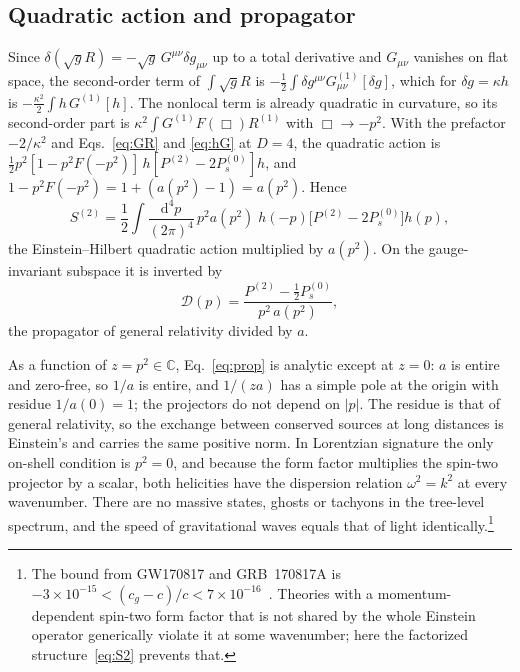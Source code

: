 \documentclass[aps,prd,10pt,twocolumn,superscriptaddress,nofootinbib,floatfix,longbibliography]{revtex4-2}
\newcommand{\bC}{\mathbb{C}}
\newcommand{\dd}{\mathrm{d}}
\newcommand{\Pt}{P^{(2)}}
\newcommand{\Ps}{P^{(0)}_{s}}
\begin{document}
\subsection{Quadratic action and propagator}
\label{sec:prop}

Since $\delta(\sqrt gR)=-\sqrt g\,G^{\mu\nu}\delta g_{\mu\nu}$ up to a total derivative and $G_{\mu\nu}$ vanishes on flat space, the second-order term of $\int\sqrt gR$ is $-\frac12\int\delta g^{\mu\nu}G^{(1)}_{\mu\nu}[\delta g]$, which for $\delta g=\kappa h$ is $-\frac{\kappa^2}2\int h\,G^{(1)}[h]$. The nonlocal term is already quadratic in curvature, so its second-order part is $\kappa^2\int G^{(1)}F(\Box)R^{(1)}$ with $\Box\to-p^2$. With the prefactor $-2/\kappa^2$ and Eqs.~\eqref{eq:GR} and \eqref{eq:hG} at $D=4$, the quadratic action is $\frac12p^2[1-p^2F(-p^2)]\,h[\Pt-2\Ps]h$, and $1-p^2F(-p^2)=1+(a(p^2)-1)=a(p^2)$. Hence
\begin{equation}
\label{eq:S2}
S^{(2)}=\frac12\int\frac{\dd^4p}{(2\pi)^4}\,p^2a(p^2)\;h(-p)\bigl[\Pt-2\Ps\bigr]h(p),
\end{equation}
the Einstein--Hilbert quadratic action multiplied by $a(p^2)$. On the gauge-invariant subspace it is inverted by
\begin{equation}
\label{eq:prop}
\mathcal D(p)=\frac{\Pt-\frac12\Ps}{p^2\,a(p^2)} ,
\end{equation}
the propagator of general relativity divided by $a$.

As a function of $z=p^2\in\bC$, Eq.~\eqref{eq:prop} is analytic except at $z=0$: $a$ is entire and zero-free, so $1/a$ is entire, and $1/(za)$ has a simple pole at the origin with residue $1/a(0)=1$; the projectors do not depend on $|p|$. The residue is that of general relativity, so the exchange between conserved sources at long distances is Einstein's and carries the same positive norm. In Lorentzian signature the only on-shell condition is $p^2=0$, and because the form factor multiplies the spin-two projector by a scalar, both helicities have the dispersion relation $\omega^2=k^2$ at every wavenumber. There are no massive states, ghosts or tachyons in the tree-level spectrum, and the speed of gravitational waves equals that of light identically.\footnote{The bound from GW170817 and GRB~170817A is $-3\times10^{-15}<(c_g-c)/c<7\times10^{-16}$~\cite{GW170817}. Theories with a momentum-dependent spin-two form factor that is not shared by the whole Einstein operator generically violate it at some wavenumber; here the factorized structure~\eqref{eq:S2} prevents that.}
\end{document}
